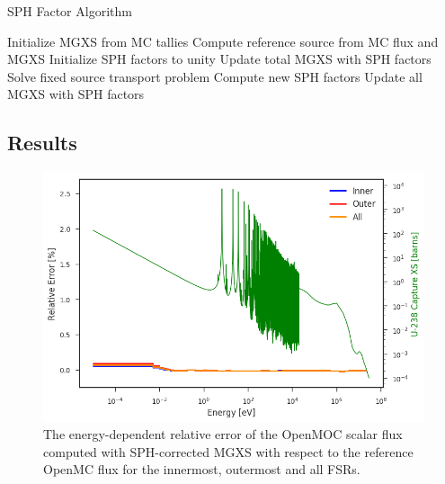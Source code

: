 \begin{algorithm}[h]
\caption{SPH Factor Algorithm}
\label{alg:sph}
\begin{algorithmic}[1]
  \State Initialize MGXS from MC tallies
  \State Compute reference source from MC flux and MGXS
  \State Initialize SPH factors to unity
    \State Update total MGXS with SPH factors
    \State Solve fixed source transport problem\footnotemark
    \State Compute new SPH factors
  \EndWhile
  \State Update all MGXS with SPH factors
\end{algorithmic}
\end{algorithm}



\subsection{Results}
\label{sec:sph-results}

\begin{figure}[h!]
\centering
\includegraphics[width=\linewidth]{figures/rel-err-inner-outer-sph}
\caption{The energy-dependent relative error of the OpenMOC scalar flux computed with SPH-corrected MGXS with respect to the reference OpenMC flux for the innermost, outermost and all FSRs.}
\label{fig:rel-err-energy-sph}
\end{figure}


